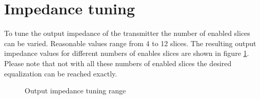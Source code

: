 \section{Impedance tuning}

To tune the output impedance of the transmitter the number of enabled slices can be varied. Reasonable values range from 4 to 12 slices. The resulting output impedance values for different numbers of enables slices are shown in figure \ref{fig:imp_tuning}. Please note that not with all these numbers of enabled slices the desired equalization can be reached exactly.



\begin{figure}[H]
  \centering
  \caption{Output impedance tuning range}
  \label{fig:imp_tuning}
\end{figure}

